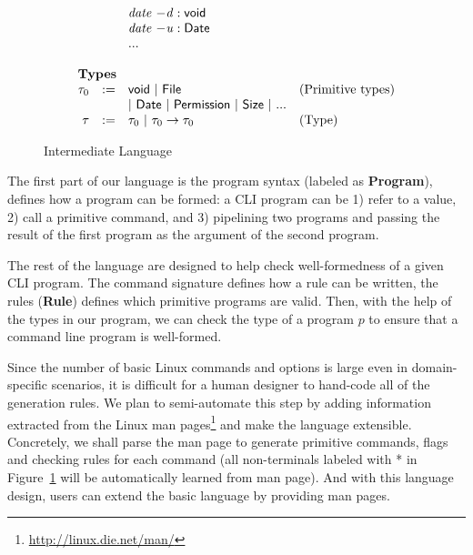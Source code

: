 \begin{figure}
\[\begin{array}{rlll}
                  &  & \mathit{date}~\mathit{-d} : \mathsf{void}\\
                  &  & \mathit{date}~\mathit{-u} : \mathsf{Date}\\
                  &  & ...\\
~\\
\multicolumn{3}{l}{\textbf{Types}}\\
\tau_0 & := & \mathsf{void} ~|~ \mathsf{File} & \textrm{(Primitive types)}\\
       &     & |~ \mathsf{Date} ~|~ \mathsf{Permission} ~|~ \mathsf{Size} ~|~ ... \\
\tau & := & \tau_0 ~|~ \tau_0\rightarrow \tau_0 & \textrm{(Type)}
\end{array}
\]
\caption{Intermediate Language}
\label{fig:lang}
\end{figure}


The first part of our language is the program syntax (labeled as \textbf{Program}), defines how a program can be formed: a CLI program can be 1) refer to a value, 2) call a primitive command, and 3) pipelining two programs and passing the result of the first program as the argument of the second program.

The rest of the language are designed to help check well-formedness of a given CLI program. The command signature defines how a rule can be written, the rules (\textbf{Rule}) defines which primitive programs are valid. Then, with the help of the types in our program, we can check the type of a program $p$ to ensure that a command line program is well-formed.

Since the number of basic Linux commands and options is large even in domain-specific scenarios, it is difficult for a human designer to hand-code all of the generation rules. We plan to semi-automate this step by adding information extracted from the Linux man pages\footnote{\url{http://linux.die.net/man/}} and make the language extensible. Concretely, we shall parse the man page to generate primitive commands, flags and checking rules for each command (all non-terminals labeled with * in Figure~\ref{fig:lang} will be automatically learned from man page). And with this language design, users can extend the basic language by providing man pages.

